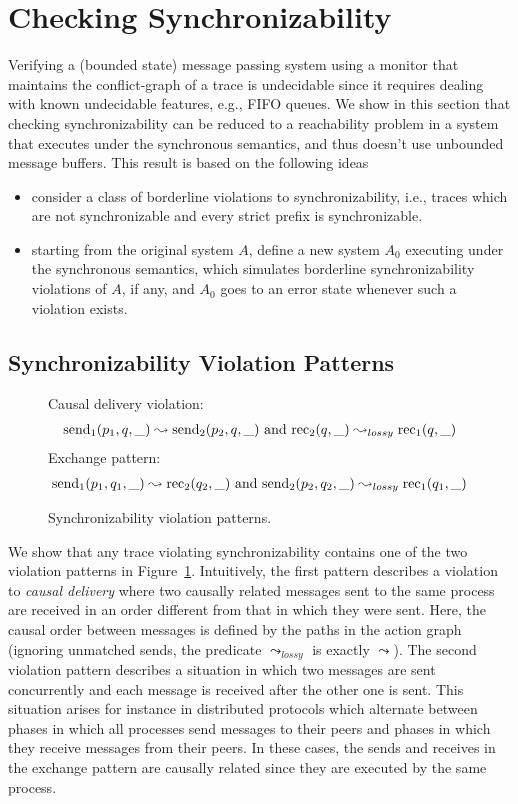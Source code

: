 \section{Checking Synchronizability}


Verifying a (bounded state) message passing system using a monitor that maintains the conflict-graph of a trace 
is undecidable since it requires dealing with known undecidable features, e.g., FIFO queues.
We show in this section that checking synchronizability can be reduced 
to a reachability problem in a system that executes under the synchronous semantics, and 
thus doesn't use unbounded message buffers. This result is based on the following ideas
\begin{itemize}
	\item consider a class of borderline violations to synchronizability, i.e., traces which
are not synchronizable and every strict prefix is synchronizable.
	\item starting from the original system $A$, define a new system $A_0$ executing under
the synchronous semantics, which simulates borderline synchronizability violations of
$A$, if any, and $A_0$ goes to an error state whenever such a violation exists.
\end{itemize}

\subsection{Synchronizability Violation Patterns}


\begin{figure}[t]
Causal delivery violation:
\begin{align*}
\mathrm{send}_{1}({p_1,q,\_})\leadsto \mathrm{send}_{2}({p_2,q,\_})\mbox{ and }
\mathrm{rec}_{2}({q,\_})  \leadsto_{lossy}  \mathrm{rec}_{1}({q,\_}) 
\end{align*}
Exchange pattern:
\begin{align*}
\mathrm{send}_{1}({p_1,q_1,\_})\leadsto \mathrm{rec}_{2}({q_2,\_})\mbox{ and }
\mathrm{send}_{2}({p_2,q_2,\_})\leadsto_{lossy} \mathrm{rec}_{1}({q_1,\_})
\end{align*}
\caption{Synchronizability violation patterns.}
\label{fig:patterns}
\end{figure}

We show that any trace violating synchronizability contains one of the two violation patterns in Figure~\ref{fig:patterns}.
Intuitively, the first pattern describes a violation to \emph{causal delivery} where two causally related messages sent to the same process
are received in an order different from that in which they were sent. Here, the causal order between messages is defined
by the paths in the action graph (ignoring unmatched sends, the predicate $\leadsto_{lossy}$ is exactly $\leadsto$). 
The second violation pattern describes a situation in which two messages are sent concurrently 
and each message is received after the other one is sent. This situation arises for instance in distributed protocols which alternate
between phases in which all processes send messages to their peers and phases in which they receive messages from their peers. 
In these cases, the sends and receives in the exchange pattern are causally related since they are executed by the same process.

